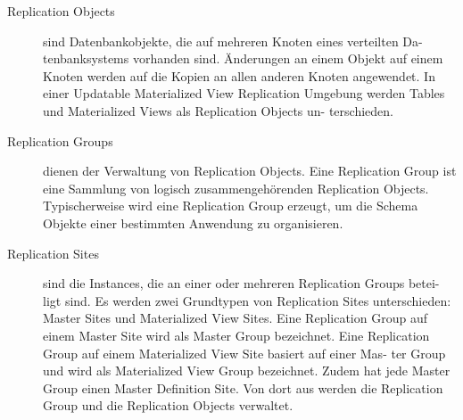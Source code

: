 \documentclass[a4paper,10pt,titlepage=false]{scrreprt}
\begin{document}
\begin{description}
  \item[Replication Objects]sind Datenbankobjekte, die auf mehreren Knoten eines verteilten Da-
tenbanksystems vorhanden sind. Änderungen an einem Objekt auf einem Knoten werden
auf die Kopien an allen anderen Knoten angewendet. In einer Updatable Materialized View
Replication Umgebung werden Tables und Materialized Views als Replication Objects un-
terschieden.
\item[Replication Groups] dienen der Verwaltung von Replication Objects. Eine Replication Group
ist eine Sammlung von logisch zusammengehörenden Replication Objects. Typischerweise
wird eine Replication Group erzeugt, um die Schema Objekte einer bestimmten Anwendung
zu organisieren.
\item[Replication Sites] sind die Instances, die an einer oder mehreren Replication Groups betei-
ligt sind. Es werden zwei Grundtypen von Replication Sites unterschieden: Master Sites und
Materialized View Sites. Eine Replication Group auf einem Master Site wird als Master Group
bezeichnet. Eine Replication Group auf einem Materialized View Site basiert auf einer Mas-
ter Group und wird als Materialized View Group bezeichnet. Zudem hat jede Master Group
einen Master Definition Site. Von dort aus werden die Replication Group und die Replication
Objects verwaltet.
\end{description}
\end{document}
